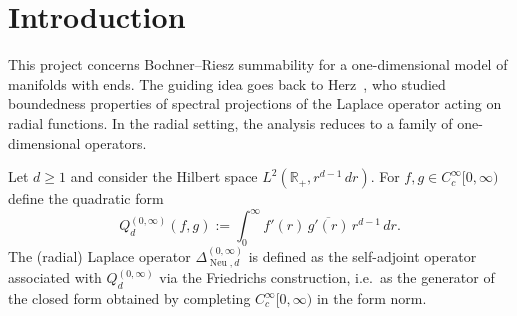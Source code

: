 \documentclass[12pt]{amsart}
\newcommand\Neu{\operatorname{Neu}}
\newcommand\LapoN{\Delta^{(0, \infty)}_{\Neu, d}}
\newcommand\R{\mathbb{R}}
\begin{document}



\section{Introduction}


This project concerns Bochner--Riesz summability for a one-dimensional model of
manifolds with ends. The guiding idea goes back to Herz~\cite{Herz}, who studied
boundedness properties of spectral projections of the Laplace operator acting on
radial functions. In the radial setting, the analysis reduces to a family of
one-dimensional operators.



Let \(d \ge 1\) and consider the Hilbert space \(L^2(\R_+, r^{d-1}\,dr)\).
For \(f,g\in C_c^\infty[0,\infty)\) define the quadratic form
\begin{equation}\label{Q1}
Q_d^{(0,\infty)}(f,g)
:=\int_0^\infty f'(r)\,\overline{g'(r)}\, r^{d-1}\,dr .
\end{equation}
The (radial) Laplace operator \(\LapoN\) %
is defined as the self-adjoint operator
associated with \(Q_d^{(0,\infty)}\) via the Friedrichs construction, i.e.\ as the
generator of the closed form obtained by completing \(C_c^\infty[0,\infty)\) in the
form norm.
\end{document}
